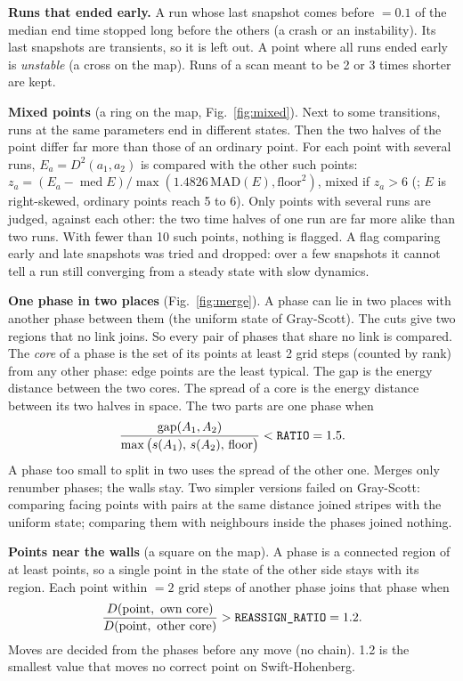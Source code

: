 \documentclass[11pt,a4paper]{article}
\newcommand{\code}[1]{\texttt{\detokenize{#1}}}
\DeclareMathOperator{\med}{med}
\begin{document}
\begin{tech}
\textbf{Runs that ended early.} A run whose last snapshot comes before \code{END_FRACTION} $=0.1$ of the median
end time stopped long before the others (a crash or an instability). Its last snapshots are transients, so it is
left out. A point where all runs ended early is \emph{unstable} (a cross on the map). Runs of a scan meant to be 2
or 3 times shorter are kept.

\textbf{Mixed points} (a ring on the map, Fig.~\ref{fig:mixed}). Next to some transitions, runs at the same
parameters end in different states. Then the two halves of the point differ far more than those of an ordinary
point. For each point with several runs, $E_a=D^2(a_1,a_2)$ is compared with the other such points:
$z_a=(E_a-\med E)/\max(1.4826\,\mathrm{MAD}(E),\text{floor}^2)$, mixed if $z_a>6$ (\code{MIXED_K}; $E$ is
right-skewed, ordinary points reach 5 to 6). Only points with several runs are judged, against each other: the two
time halves of one run are far more alike than two runs. With fewer than 10 such points, nothing is flagged. A flag
comparing early and late snapshots was tried and dropped: over a few snapshots it cannot tell a run still
converging from a steady state with slow dynamics.

\textbf{One phase in two places} (Fig.~\ref{fig:merge}). A phase can lie in two places with another phase between
them (the uniform state of Gray-Scott). The cuts give two regions that no link joins. So every pair of phases that
share no link is compared. The \emph{core} of a phase is the set of its points at least 2 grid steps (counted by
rank) from any other phase: edge points are the least typical. The gap is the energy distance between the two
cores. The spread of a core is the energy distance between its two halves in space. The two parts are one phase
when
\[
\frac{\text{gap}(A_1,A_2)}{\max\big(s(A_1),\,s(A_2),\,\text{floor}\big)}<\text{\code{RATIO}}=1.5 .
\]
A phase too small to split in two uses the spread of the other one. Merges only renumber phases; the walls stay.
Two simpler versions failed on Gray-Scott: comparing facing points with pairs at the same distance joined stripes
with the uniform state; comparing them with neighbours inside the phases joined nothing.

\textbf{Points near the walls} (a square on the map). A phase is a connected region of at least
\code{MIN_PHASE} points, so a single point in the state of the other side stays with its region. Each point within
\code{NEAR} $=2$ grid steps of another phase joins that phase when
\[
\frac{D(\text{point},\ \text{own core})}{D(\text{point},\ \text{other core})}>\text{\code{REASSIGN_RATIO}}=1.2 .
\]
Moves are decided from the phases before any move (no chain). 1.2 is the smallest value that moves no correct point
on Swift-Hohenberg.


\end{tech}
\end{document}
